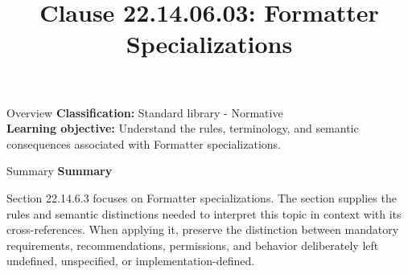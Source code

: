 \documentclass[10pt,letterpaper]{article}
\title{Clause 22.14.06.03: Formatter Specializations}
\author{}
\date{}
\begin{document}
\maketitle
\begin{CornellOverviewBox}{Overview}
\textbf{Classification:} Standard library - Normative\\[2pt]
\textbf{Learning objective:} Understand the rules, terminology, and semantic consequences associated with Formatter specializations.
\end{CornellOverviewBox}\begin{CornellSummaryBox}{Summary}
{\sffamily\bfseries\color{Accent} Summary}\par\vspace{3pt}Section 22.14.6.3 focuses on Formatter specializations. The section supplies the rules and semantic distinctions needed to interpret this topic in context with its cross-references. When applying it, preserve the distinction between mandatory requirements, recommendations, permissions, and behavior deliberately left undefined, unspecified, or implementation-defined.
\end{CornellSummaryBox}
\end{document}
